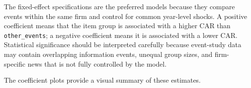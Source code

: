 \documentclass[12pt]{article}
\begin{document}
	\begin{table}[H]
		\centering
		\caption{Regression Results: CARs by 8-K Item Group}
		\label{tab:regressions}
	\end{table}
	
	The fixed-effect specifications are the preferred models because they compare events within the same firm and control for common year-level shocks. A positive coefficient means that the item group is associated with a higher CAR than \texttt{other\_events}; a negative coefficient means it is associated with a lower CAR. Statistical significance should be interpreted carefully because event-study data may contain overlapping information events, unequal group sizes, and firm-specific news that is not fully controlled by the model.
	
	The coefficient plots provide a visual summary of these estimates.
	
\end{document}
